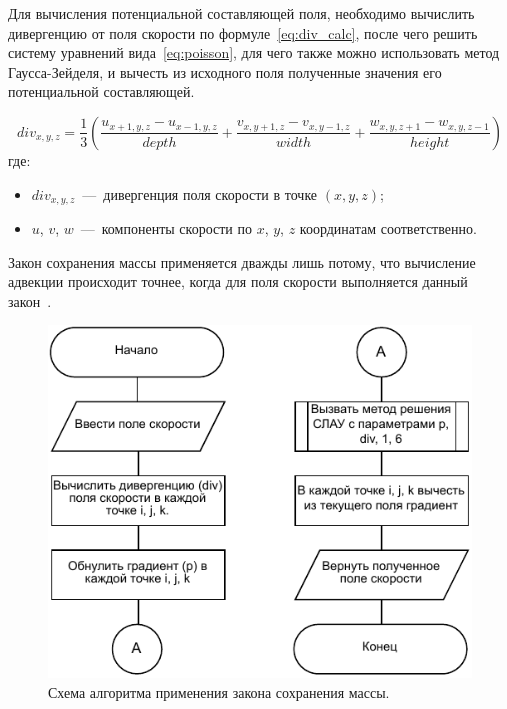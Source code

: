 Для вычисления потенциальной составляющей поля, необходимо вычислить дивергенцию от поля скорости по формуле~\ref{eq:div_calc}, после чего решить систему уравнений вида~\ref{eq:poisson}, для чего также можно использовать метод Гаусса-Зейделя, и вычесть из исходного поля полученные значения его потенциальной составляющей.

\begin{equation}
	\label{eq:div_calc}
	div_{x, y, z } = \frac{1}{3}(\frac{u_{x+1, y, z}-u_{x-1, y, z}}{depth}+\frac{v_{x, y+1, z}-v_{x, y-1, z}}{width} + \frac{w_{x, y, z+1}-w_{x, y, z-1}}{height})
\end{equation}
где:
\begin{itemize}
	\item $div_{x, y, z }$~---~дивергенция поля скорости в точке $(x, y, z)$;
	\item $u$, $v$, $w$~---~компоненты скорости по $x$, $y$, $z$ координатам соответственно.
\end{itemize}

Закон сохранения массы применяется дважды лишь потому, что вычисление адвекции происходит точнее, когда для поля скорости выполняется данный закон~\cite{stam}.



\begin{figure}[H]
	\centering
	\includegraphics[width=1.0\textwidth,page=1]{assets/img/project.pdf}
	\caption{Схема алгоритма применения закона сохранения массы.}
	\label{fig:project}
\end{figure}

